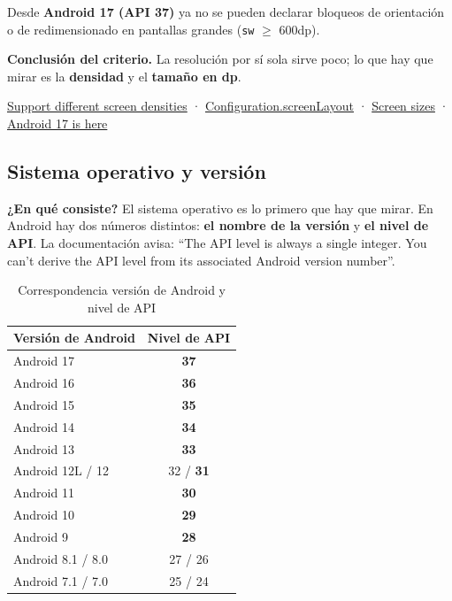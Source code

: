 \documentclass[11pt,a4paper]{article}
\newcommand{\code}[1]{\texttt{\color{ink}#1}}
\newcommand{\campo}[1]{\textbf{\color{ink}#1}}
\begin{document}
	Desde \textbf{Android 17 (API 37)} ya no se pueden declarar bloqueos de orientación o de redimensionado en pantallas grandes (\code{sw} $\geq$ 600dp).
	
	\campo{Conclusión del criterio.} La resolución por sí sola sirve poco; lo que hay que mirar es la \textbf{densidad} y el \textbf{tamaño en dp}.
	
	\begin{fuentesbox}
		\href{https://developer.android.com/training/multiscreen/screendensities}{Support different screen densities} ·
		\href{https://developer.android.com/reference/android/content/res/Configuration}{Configuration.screenLayout} ·
		\href{https://developer.android.com/training/multiscreen/screensizes}{Screen sizes} ·
		\href{https://developer.android.com/blog/posts/android-17-is-here}{Android 17 is here}
	\end{fuentesbox}
	
	\subsection{Sistema operativo y versión}
	
	\campo{¿En qué consiste?}
	El sistema operativo es lo primero que hay que mirar. En Android hay dos números distintos: \textbf{el nombre de la versión} y \textbf{el nivel de API}. La documentación avisa: \enquote{The API level is always a single integer. You can't derive the API level from its associated Android version number}.
	
	\begin{table}[htbp]
		\centering
		\small
		\begin{tabular}{@{}l c@{}}
			\toprule
			\rowcolor{primary}
			\textcolor{paper}{\sffamily\bfseries Versión de Android} & \textcolor{paper}{\sffamily\bfseries Nivel de API} \\
			\midrule
			Android 17 & \textbf{37} \\
			\rowcolor{soft}
			Android 16 & \textbf{36} \\
			Android 15 & \textbf{35} \\
			\rowcolor{soft}
			Android 14 & \textbf{34} \\
			Android 13 & \textbf{33} \\
			\rowcolor{soft}
			Android 12L / 12 & 32 / \textbf{31} \\
			Android 11 & \textbf{30} \\
			\rowcolor{soft}
			Android 10 & \textbf{29} \\
			Android 9 & \textbf{28} \\
			\rowcolor{soft}
			Android 8.1 / 8.0 & 27 / 26 \\
			Android 7.1 / 7.0 & 25 / 24 \\
			\bottomrule
		\end{tabular}
		\caption{Correspondencia versión de Android y nivel de API}
	\end{table}
	
\end{document}
